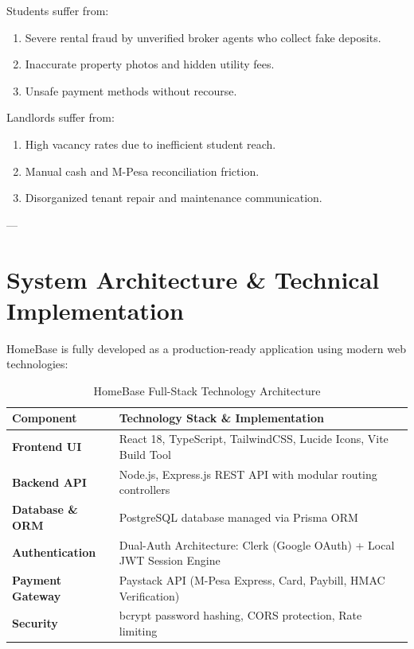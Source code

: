 \documentclass[11pt,a4paper]{article}
\begin{document}
Students suffer from:
\begin{enumerate}[noitemsep]
    \item Severe rental fraud by unverified broker agents who collect fake deposits.
    \item Inaccurate property photos and hidden utility fees.
    \item Unsafe payment methods without recourse.
\end{enumerate}

Landlords suffer from:
\begin{enumerate}[noitemsep]
    \item High vacancy rates due to inefficient student reach.
    \item Manual cash and M-Pesa reconciliation friction.
    \item Disorganized tenant repair and maintenance communication.
\end{enumerate}

---

\section{System Architecture \& Technical Implementation}

HomeBase is fully developed as a production-ready application using modern web technologies:

\begin{table}[h]
\centering
\begin{tabularx}{\textwidth}{l X}
\toprule
\textbf{Component} & \textbf{Technology Stack \& Implementation} \\
\midrule
\textbf{Frontend UI} & React 18, TypeScript, TailwindCSS, Lucide Icons, Vite Build Tool \\
\textbf{Backend API} & Node.js, Express.js REST API with modular routing controllers \\
\textbf{Database \& ORM} & PostgreSQL database managed via Prisma ORM \\
\textbf{Authentication} & Dual-Auth Architecture: Clerk (Google OAuth) + Local JWT Session Engine \\
\textbf{Payment Gateway} & Paystack API (M-Pesa Express, Card, Paybill, HMAC Verification) \\
\textbf{Security} & bcrypt password hashing, CORS protection, Rate limiting \\
\bottomrule
\end{tabularx}
\caption{HomeBase Full-Stack Technology Architecture}
\end{table}
\end{document}
